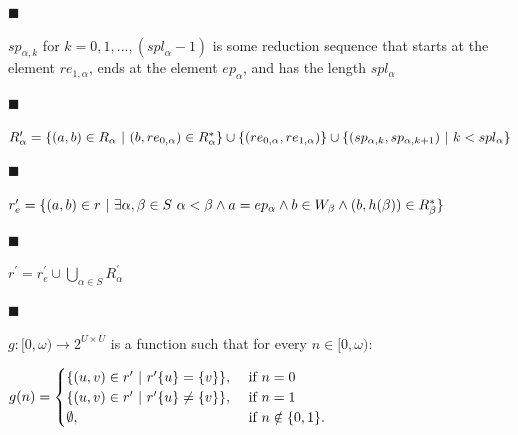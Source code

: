 \documentclass[10pt,a4paper]{amsart}
\begin{document}
 
 
\par\noindent  $\blacksquare$ 
 
${sp}_{\alpha,k}$ for $k=0,1,...,({spl}_{\alpha}-1)$ is some reduction sequence that starts at the element ${re}_{1,\alpha}$, ends at the element ${ep}_{\alpha}$, and has the length $spl_{\alpha}$\par
 
 
 
\par\noindent  $\blacksquare$ 
 
$R^{\prime}_{\alpha}=\{(a,b)\in R_{\alpha}\leavevmode\nobreak\ |\leavevmode%
\nobreak\ (b,{re}_{0,\alpha})\in R_{\alpha}^{*}\}\cup\{({re}_{0,\alpha},re_{1,%
\alpha})\}\cup\{(sp_{\alpha,k},sp_{\alpha,k+1})\leavevmode\nobreak\ |%
\leavevmode\nobreak\ k<spl_{\alpha}\}$\par
 
 
 
\par\noindent  $\blacksquare$ 
 
$r_{e}^{\prime}=\{(a,b)\in r\leavevmode\nobreak\ |\leavevmode\nobreak\ \exists%
\alpha,\beta\in S\leavevmode\nobreak\ \alpha<\beta\wedge a=ep_{\alpha}\wedge b%
\in W_{\beta}\wedge(b,h(\beta))\in R_{\beta}^{*}\}$\par
 
 
 
\par\noindent  $\blacksquare$ 
 
$r^{\prime}=r_{e}^{\prime}\cup\bigcup_{\alpha\in S}R^{\prime}_{\alpha}$\par
 
 
 
\par\noindent  $\blacksquare$ 
 
$g:[0,\omega)\to 2^{U\times U}$ is a function such that for every $n\in[0,\omega)$:\par
 
 
 
$g(n)=\begin{cases}\{(u,v)\in r^{\prime}\leavevmode\nobreak\ |\leavevmode%
\nobreak\ r^{\prime}\{u\}=\{v\}\},&\text{ if }n=0\\
\{(u,v)\in r^{\prime}\leavevmode\nobreak\ |\leavevmode\nobreak\ r^{\prime}\{u%
\}\neq\{v\}\},&\text{ if }n=1\\
\emptyset,&\text{ if }n\notin\{0,1\}.\\
\end{cases}$\par
 
\end{document}
